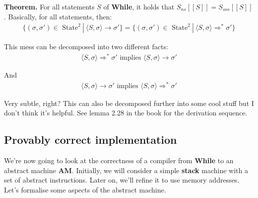 \documentclass[11pt,a4paper,headsepline,titlepage,dvipsnames,cmyk]{scrartcl}
\begin{document}
\begin{itemize}
\begin{itemize}
    \end{itemize}
\end{itemize}

\newpage
\textbf{Theorem.} For all statements $S$ of \textbf{While}, it holds that
$S_{ns}[[S]] = S_{sos}[[S]]$. Basically, for all statements, then:
\begin{align*}
    \{(\sigma, \sigma') \in \text{ State}^2 \ | \ \langle S, \sigma \rangle
        \rightarrow \sigma' \} = \{(\sigma, \sigma') \in \text{ State}^2 \
        | \
    \langle S, \sigma \rangle \Rightarrow ^* \sigma'\}
\end{align*}

This mess can be decomposed into two different facts:
\begin{align*}
    \langle S, \sigma \rangle \Rightarrow ^* \sigma' \text{ implies }
    \langle S, \sigma \rangle \rightarrow \sigma'
\end{align*}

And
\begin{align*}
    \langle S, \sigma \rangle \rightarrow \sigma' \text{ implies }
    \langle S, \sigma \rangle \Rightarrow^* \sigma'
\end{align*}

Very subtle, right? This can also be decomposed further into some cool
stuff but I don't think it's helpful. See lemma 2.28 in the book for the
derivation sequence.

\subsection{Provably correct implementation}%
\label{sub:Provably correct implementation}
We're now going to look at the correctness of a compiler from
\textbf{While} to an abstract machine \textbf{AM}. Initially, we will
consider a simple \textbf{stack} machine with a set of abstract
instructions. Later on, we'll refine it to use memory addresses. Let's
formalise some aspects of the abstract machine.
\end{document}
